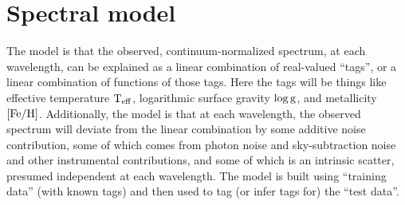 \documentclass[12pt, preprint]{aastex}
\newcommand{\teff}{\mbox{$\rm T_{eff}$}}
\newcommand{\feh}{\mbox{$\rm [Fe/H]$}}
\newcommand{\logg}{\mbox{$\rm \log g$}}
\begin{document}
\section{Spectral model}

The model is that the observed, continuum-normalized spectrum, at each
wavelength, can be explained as a linear combination of real-valued
``tags'', or a linear combination of functions of those tags.
Here the tags will be things like effective temperature $\teff$,
logarithmic surface gravity $\logg$, and metallicity $\feh$.
Additionally, the model is that at each wavelength, the observed
spectrum will deviate from the linear combination by some additive
noise contribution, some of which comes from photon noise and
sky-subtraction noise and other instrumental contributions, and some
of which is an intrinsic scatter, presumed independent at each
wavelength.
The model is built using ``training data'' (with known tags) and then
used to tag (or infer tags for) the ``test data''.
\end{document}
